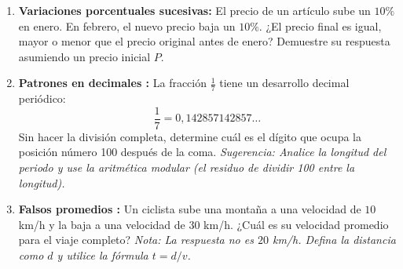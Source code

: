 \begin{enumerate}
    \item \textbf{Variaciones porcentuales sucesivas:}
    El precio de un artículo sube un $10\%$ en enero. En febrero, el nuevo precio baja un $10\%$. ¿El precio final es igual, mayor o menor que el precio original antes de enero? Demuestre su respuesta asumiendo un precio inicial $P$.

    \item \textbf{Patrones en decimales :}
    La fracción $\frac{1}{7}$ tiene un desarrollo decimal periódico:
    \[ \frac{1}{7} = 0,142857142857\dots \]
    Sin hacer la división completa, determine cuál es el dígito que ocupa la posición número 100 después de la coma.
    \textit{Sugerencia: Analice la longitud del periodo y use la aritmética modular (el residuo de dividir 100 entre la longitud).}

    \item \textbf{Falsos promedios :}
    Un ciclista sube una montaña a una velocidad de $10$ km/h y la baja a una velocidad de $30$ km/h. ¿Cuál es su velocidad promedio para el viaje completo?
    \textit{Nota: La respuesta no es $20$ km/h. Defina la distancia como $d$ y utilice la fórmula $t = d/v$.}
\end{enumerate}

